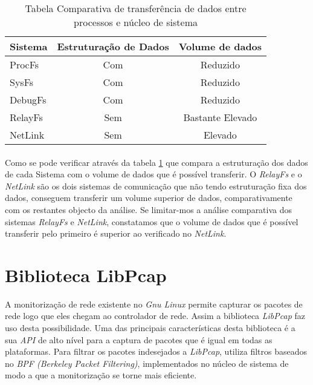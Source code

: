 

\begin{table}[h]
\begin{center}

\begin{tabular}{|l||c|c|}
\hline
Sistema & Estruturação de Dados & Volume de dados \\
\hline
ProcFs & Com & Reduzido \\
\hline
SysFs & Com & Reduzido \\
\hline
DebugFs & Com & Reduzido \\
\hline
RelayFs & Sem & Bastante Elevado \\
\hline
NetLink & Sem & Elevado \\
\hline
\end{tabular}
\caption{Tabela Comparativa de transferência de dados entre processos e núcleo de sistema}
\label{tab:transf_compare}
\end{center}
\end{table}

\paragraph*{}
Como se pode verificar através da tabela \ref{tab:transf_compare} que compara a estruturação dos dados de cada Sistema com o volume de dados que é possível transferir.
O \textit{RelayFs} e o \textit{NetLink} são os dois sistemas de comunicação que não tendo estruturação fixa dos dados, conseguem transferir um volume superior de dados, comparativamente com os restantes objecto da análise.
Se limitar-mos a análise comparativa dos sistemas \textit{RelayFs} e \textit{NetLink}, constatamos que o volume de dados que é possível transferir pelo primeiro é superior ao verificado no \textit{NetLink}.

\section{Biblioteca LibPcap}\label{sect:LibPcap}

A monitorização de rede existente no \textit{Gnu Linux} permite capturar os pacotes de rede logo que eles chegam ao controlador de rede.
Assim a biblioteca \textit{LibPcap}\cite{:LibPcap} faz uso desta possibilidade.
Uma das principais características desta biblioteca é a sua \textit{API} de alto nível para a captura de pacotes que é igual em todas as plataformas.
Para filtrar os pacotes indesejados a \textit{LibPcap}, utiliza filtros baseados no \textit{BPF (Berkeley Packet Filtering)}, implementados no núcleo de sistema de modo a que a monitorização se torne mais eficiente.

